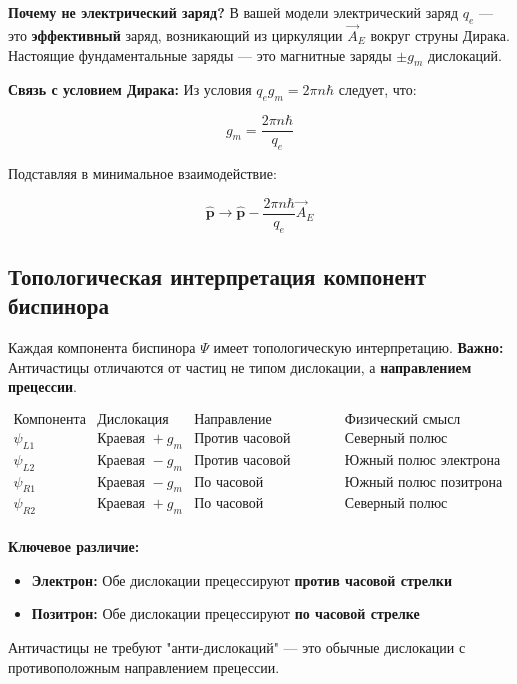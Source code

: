 \documentclass[12pt]{article}
\begin{document}
\textbf{Почему не электрический заряд?} В вашей модели электрический заряд $q_e$ — это \textbf{эффективный} заряд, возникающий из циркуляции $\vec{A}_E$ вокруг струны Дирака. Настоящие фундаментальные заряды — это магнитные заряды $\pm g_m$ дислокаций.

\textbf{Связь с условием Дирака:} Из условия $q_e g_m = 2\pi n \hbar$ следует, что:

\[
g_m = \frac{2\pi n \hbar}{q_e}
\]

Подставляя в минимальное взаимодействие:

\[
\hat{\boldsymbol{p}} \to \hat{\boldsymbol{p}} - \frac{2\pi n \hbar}{q_e} \vec{A}_E
\]

\subsection{Топологическая интерпретация компонент биспинора}

Каждая компонента биспинора $\Psi$ имеет топологическую интерпретацию. \textbf{Важно:} Античастицы отличаются от частиц не типом дислокации, а \textbf{направлением прецессии}.

\[
\begin{array}{c|c|c|c}
\textbf{Компонента} & \textbf{Дислокация} & \textbf{Направление прецессии} & \textbf{Физический смысл} \\
\hline
\psi_{L1} & \text{Краевая } +g_m & \text{Против часовой} & \text{Северный полюс электрона} \\
\psi_{L2} & \text{Краевая } -g_m & \text{Против часовой} & \text{Южный полюс электрона} \\
\psi_{R1} & \text{Краевая } -g_m & \text{По часовой} & \text{Южный полюс позитрона} \\
\psi_{R2} & \text{Краевая } +g_m & \text{По часовой} & \text{Северный полюс позитрона} \\
\end{array}
\]

\textbf{Ключевое различие:}
\begin{itemize}
\item \textbf{Электрон:} Обе дислокации прецессируют \textbf{против часовой стрелки}
\item \textbf{Позитрон:} Обе дислокации прецессируют \textbf{по часовой стрелке}
\end{itemize}

Античастицы не требуют "анти-дислокаций" — это обычные дислокации с противоположным направлением прецессии.
\end{document}
